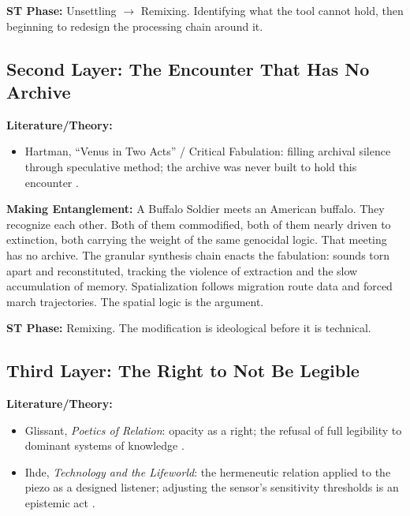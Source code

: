 \noindent\textbf{ST Phase:} Unsettling $\to$ Remixing. Identifying what the tool cannot hold, then beginning to redesign the processing chain around it.

\medskip

\subsection*{Second Layer: The Encounter That Has No Archive}

\noindent\textbf{Literature/Theory:}
\begin{itemize}[noitemsep]
    \item Hartman, ``Venus in Two Acts'' / Critical Fabulation: filling archival silence through speculative method; the archive was never built to hold this encounter \parencite{Hartman_2008}.
\end{itemize}

\noindent\textbf{Making Entanglement:} A Buffalo Soldier meets an American buffalo. They recognize each other. Both of them commodified, both of them nearly driven to extinction, both carrying the weight of the same genocidal logic. That meeting has no archive. The granular synthesis chain enacts the fabulation: sounds torn apart and reconstituted, tracking the violence of extraction and the slow accumulation of memory. Spatialization follows migration route data and forced march trajectories. The spatial logic is the argument.

\noindent\textbf{ST Phase:} Remixing. The modification is ideological before it is technical.

\medskip

\subsection*{Third Layer: The Right to Not Be Legible}

\noindent\textbf{Literature/Theory:}
\begin{itemize}[noitemsep]
    \item Glissant, \textit{Poetics of Relation}: opacity as a right; the refusal of full legibility to dominant systems of knowledge \parencite{Glissant_1997}.
    \item Ihde, \textit{Technology and the Lifeworld}: the hermeneutic relation applied to the piezo as a designed listener; adjusting the sensor's sensitivity thresholds is an epistemic act \parencite{Ihde_1990}.
\end{itemize}

